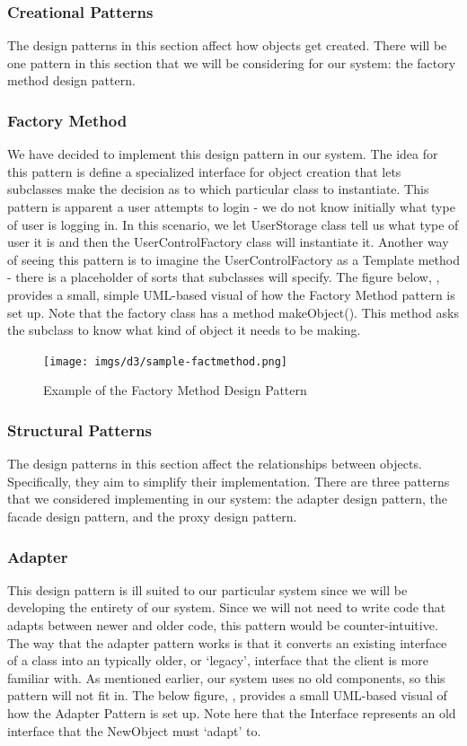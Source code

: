 \documentclass[12pt,letterpaper]{article}
\begin{document}
\subsubsection{Creational Patterns}
The design patterns in this section affect how objects get created. There will be one pattern in this section that we will be considering for our system: the factory method design pattern. 

\subsubsection*{Factory Method}
We have decided to implement this design pattern in our system. The idea for this pattern is define a specialized interface for object creation that lets subclasses make the decision as to which particular class to instantiate. This pattern is apparent a user attempts to login - we do not know initially what type of user is logging in. In this scenario, we let UserStorage class tell us what type of user it is and then the UserControlFactory class will instantiate it. Another way of seeing this pattern is to imagine the UserControlFactory as a Template method - there is a placeholder of sorts that subclasses will specify. The figure below, , provides a small, simple UML-based visual of how the Factory Method pattern is set up. Note that the factory class has a method makeObject(). This method asks the subclass to know what kind of object it needs to be making.

\begin{figure}[H]
	\centering{}
	\texttt{[image: imgs/d3/sample-factmethod.png]}
	\caption{Example of the Factory Method Design Pattern}
\end{figure}

\subsubsection{Structural Patterns}
The design patterns in this section affect the relationships between objects. Specifically, they aim to simplify their implementation. There are three patterns that we considered implementing in our system: the adapter design pattern, the facade design pattern, and the proxy design pattern.

\subsubsection*{Adapter}
This design pattern is ill suited to our particular system since we will be developing the entirety of our system. Since we will not need to write code that adapts between newer and older code, this pattern would be counter-intuitive. The way that the adapter pattern works is that it converts an existing interface of a class into an typically older, or `legacy', interface that the client is more familiar with. As mentioned earlier, our system uses no old components, so this pattern will not fit in. The below figure, , provides a small UML-based visual of how the Adapter Pattern is set up. Note here that the Interface represents an old interface that the NewObject must `adapt' to.
\end{document}
